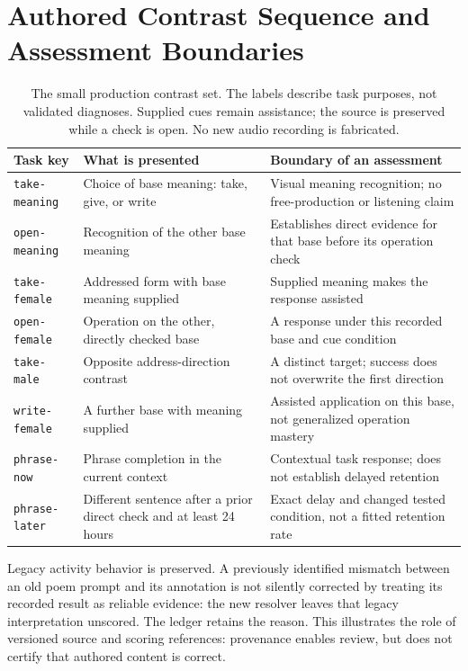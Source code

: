 \documentclass{article}
\begin{document}
\section{Authored Contrast Sequence and Assessment Boundaries}
\label{app:contrasts}

\begin{table}[ht]
\caption{The small production contrast set. The labels describe task purposes, not validated diagnoses. Supplied cues remain assistance; the source is preserved while a check is open. No new audio recording is fabricated.}
\centering
\begin{tabular}{p{}p{}p{}}
\toprule
Task key & What is presented & Boundary of an assessment \\
\midrule
\texttt{take-meaning} & Choice of base meaning: take, give, or write & Visual meaning recognition; no free-production or listening claim \\
\texttt{open-meaning} & Recognition of the other base meaning & Establishes direct evidence for that base before its operation check \\
\texttt{take-female} & Addressed form with base meaning supplied & Supplied meaning makes the response assisted \\
\texttt{open-female} & Operation on the other, directly checked base & A response under this recorded base and cue condition \\
\texttt{take-male} & Opposite address-direction contrast & A distinct target; success does not overwrite the first direction \\
\texttt{write-female} & A further base with meaning supplied & Assisted application on this base, not generalized operation mastery \\
\texttt{phrase-now} & Phrase completion in the current context & Contextual task response; does not establish delayed retention \\
\texttt{phrase-later} & Different sentence after a prior direct check and at least 24 hours & Exact delay and changed tested condition, not a fitted retention rate \\
\bottomrule
\end{tabular}
\end{table}

Legacy activity behavior is preserved. A previously identified mismatch between an old poem prompt and its annotation is not silently corrected by treating its recorded result as reliable evidence: the new resolver leaves that legacy interpretation unscored. The ledger retains the reason. This illustrates the role of versioned source and scoring references: provenance enables review, but does not certify that authored content is correct.
\end{document}
